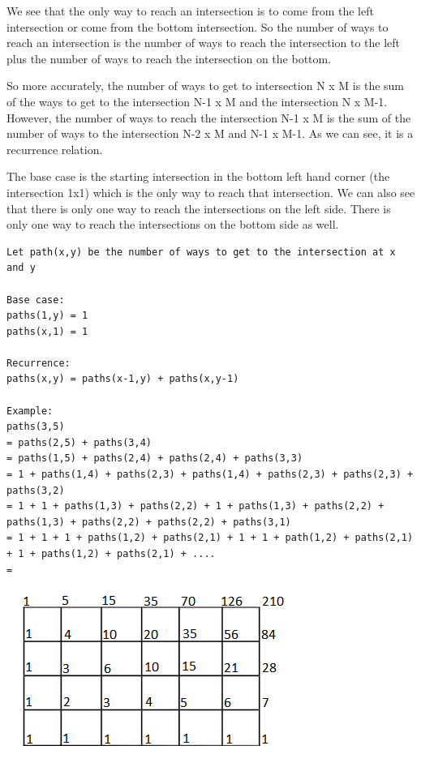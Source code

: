 \documentclass[11pt,oneside]{book}
\makeatletter
\def\maxwidth#1{\ifdim\Gin@nat@width>#1 #1\else\Gin@nat@width\fi}
\makeatother
\begin{document}
We see that the only way to reach an intersection is to come from the left intersection or come from the bottom intersection. So the number of ways to reach an intersection is the number of ways to reach the intersection to the left plus the number of ways to reach the intersection on the bottom.

So more accurately, the number of ways to get to intersection N x M is the sum of the ways to get to the intersection N-1 x M and the intersection N x M-1. However, the number of ways to reach the intersection N-1 x M is the sum of the number of ways to the intersection N-2 x M and N-1 x M-1. As we can see, it is a recurrence relation.

The base case is the starting intersection in the bottom left hand corner (the intersection 1x1) which is the only way to reach that intersection. We can also see that there is only one way to reach the intersections on the left side. There is only one way to reach the intersections on the bottom side as well.

\begin{lstlisting}
Let path(x,y) be the number of ways to get to the intersection at x and y

Base case:
paths(1,y) = 1
paths(x,1) = 1

Recurrence:
paths(x,y) = paths(x-1,y) + paths(x,y-1)

Example:
paths(3,5)
= paths(2,5) + paths(3,4)
= paths(1,5) + paths(2,4) + paths(2,4) + paths(3,3)
= 1 + paths(1,4) + paths(2,3) + paths(1,4) + paths(2,3) + paths(2,3) + paths(3,2)
= 1 + 1 + paths(1,3) + paths(2,2) + 1 + paths(1,3) + paths(2,2) + paths(1,3) + paths(2,2) + paths(2,2) + paths(3,1)
= 1 + 1 + 1 + paths(1,2) + paths(2,1) + 1 + 1 + path(1,2) + paths(2,1) + 1 + paths(1,2) + paths(2,1) + ....
= 
\end{lstlisting}

\includegraphics[width=\maxwidth{\textwidth}]{recursion_grid2.png}
\end{document}
